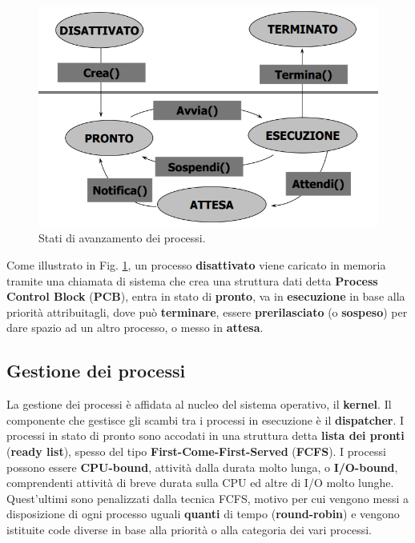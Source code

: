 \documentclass{article}
\begin{document}
\begin{figure}[H]
    \centering
    \includegraphics[scale=0.5]{statoprocesso}
    \caption{Stati di avanzamento dei processi.}
    \label{fig:stato_processi}
\end{figure}

\noindent Come illustrato in Fig.  \ref{fig:stato_processi}, un processo \textbf{disattivato} viene caricato in memoria tramite una chiamata di sistema che crea una struttura dati detta \textbf{Process Control Block} (\textbf{PCB}), entra in stato di \textbf{pronto}, va in \textbf{esecuzione} in base alla priorità attribuitagli, dove può \textbf{terminare}, essere \textbf{prerilasciato} (o \textbf{sospeso}) per dare spazio ad un altro processo, o messo in \textbf{attesa}.

\subsection{Gestione dei processi} La gestione dei processi è affidata al nucleo del sistema operativo, il \textbf{kernel}. Il componente che gestisce gli scambi tra i processi in esecuzione è il \textbf{dispatcher}. I processi in stato di pronto sono accodati in una struttura detta \textbf{lista dei pronti} (\textbf{ready list}), spesso del tipo \textbf{First-Come-First-Served} (\textbf{FCFS}). I processi possono essere \textbf{CPU-bound}, attività dalla durata molto lunga, o \textbf{I/O-bound}, comprendenti attività di breve durata sulla CPU ed altre di I/O molto lunghe. Quest'ultimi sono penalizzati dalla tecnica FCFS, motivo per cui vengono messi a disposizione di ogni processo uguali \textbf{quanti} di tempo (\textbf{round-robin}) e vengono istituite code diverse in base alla priorità o alla categoria dei vari processi.
\end{document}
